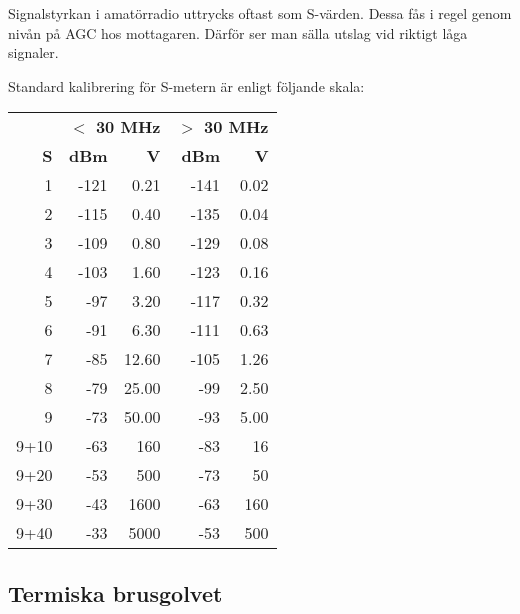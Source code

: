 Signalstyrkan i amatörradio uttrycks oftast som S-värden. Dessa fås i regel genom nivån på AGC hos mottagaren. Därför ser man sälla utslag vid riktigt låga signaler.

Standard kalibrering för S-metern är enligt följande skala:

\begin{center}
\begin{longtable}{r|rr|rr}
	     & \multicolumn{2}{c|}{\textbf{$<$ 30 MHz}} & \multicolumn{2}{c}{\textbf{$>$ 30 MHz}} \\ 
	   \textbf{S} &  \textbf{dBm} &                \textbf{\textmu V} &  \textbf{dBm} &               \textbf{\textmu V} \\ \hline \endhead
	   1 & -121 &                     0.21 & -141 &                    0.02 \\
	   2 & -115 &                     0.40 & -135 &                    0.04 \\
	   3 & -109 &                     0.80 & -129 &                    0.08 \\
	   4 & -103 &                     1.60 & -123 &                    0.16 \\
	   5 &  -97 &                     3.20 & -117 &                    0.32 \\
	   6 &  -91 &                     6.30 & -111 &                    0.63 \\
	   7 &  -85 &                    12.60 & -105 &                    1.26 \\
	   8 &  -79 &                    25.00 &  -99 &                    2.50 \\
	   9 &  -73 &                    50.00 &  -93 &                    5.00 \\
	9+10 &  -63 &                      160 &  -83 &                      16 \\
	9+20 &  -53 &                      500 &  -73 &                      50 \\
	9+30 &  -43 &                     1600 &  -63 &                     160 \\
	9+40 &  -33 &                     5000 &  -53 &                     500
\end{longtable}
\end{center}
\subsection{Termiska brusgolvet}

